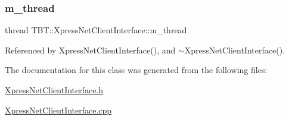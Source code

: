 \subsubsection{\texorpdfstring{m\+\_\+thread}{m\_thread}}
{\footnotesize\ttfamily thread T\+B\+T\+::\+Xpress\+Net\+Client\+Interface\+::m\+\_\+thread\hspace{0.3cm}{\ttfamily [private]}}



Referenced by Xpress\+Net\+Client\+Interface(), and $\sim$\+Xpress\+Net\+Client\+Interface().



The documentation for this class was generated from the following files\+:\begin{DoxyCompactItemize}
\item 
\hyperlink{XpressNetClientInterface_8h}{Xpress\+Net\+Client\+Interface.\+h}\item 
\hyperlink{XpressNetClientInterface_8cpp}{Xpress\+Net\+Client\+Interface.\+cpp}\end{DoxyCompactItemize}
